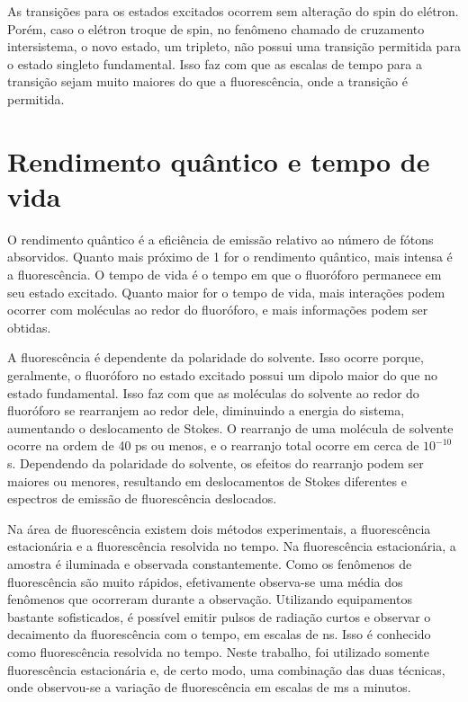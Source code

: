 		As transições para os estados excitados ocorrem sem alteração do spin do elétron. Porém, caso o elétron troque de spin, no fenômeno chamado de cruzamento intersistema, o novo estado, um tripleto, não possui uma transição permitida para o estado singleto fundamental. Isso faz com que as escalas de tempo para a transição sejam muito maiores do que a fluorescência, onde a transição é permitida.
		
	
		
		\section{Rendimento quântico e tempo de vida}
				
		O rendimento quântico é a eficiência de emissão relativo ao número de fótons absorvidos. Quanto mais próximo de 1 for o rendimento quântico, mais intensa é a fluorescência. O tempo de vida é o tempo em que o fluoróforo permanece em seu estado excitado. Quanto maior for o tempo de vida, mais interações podem ocorrer com moléculas ao redor do fluoróforo, e mais informações podem ser obtidas.
		
		A fluorescência é dependente da polaridade do solvente. Isso ocorre porque, geralmente, o fluoróforo no estado excitado possui um dipolo maior do que no estado fundamental. Isso faz com que as moléculas do solvente ao redor do fluoróforo se rearranjem ao redor dele, diminuindo a energia do sistema, aumentando o deslocamento de Stokes. O rearranjo de uma molécula de solvente ocorre na ordem de 40 ps ou menos, e o rearranjo total ocorre em cerca de \(10^{-10}\) s. Dependendo da polaridade do solvente, os efeitos do rearranjo podem ser maiores ou menores, resultando em deslocamentos de Stokes diferentes e espectros de emissão de fluorescência deslocados.
		
		Na área de fluorescência existem dois métodos experimentais, a fluorescência estacionária e a fluorescência resolvida no tempo. Na fluorescência estacionária, a amostra é iluminada e observada constantemente. Como os fenômenos de fluorescência são muito rápidos, efetivamente observa-se uma média dos fenômenos que ocorreram durante a observação. Utilizando equipamentos bastante sofisticados, é possível emitir pulsos de radiação curtos e observar o decaimento da fluorescência com o tempo, em escalas de ns. Isso é conhecido como fluorescência resolvida no tempo. Neste trabalho, foi utilizado somente fluorescência estacionária e, de certo modo, uma combinação das duas técnicas, onde observou-se a variação de fluorescência em escalas de ms a minutos.
		
